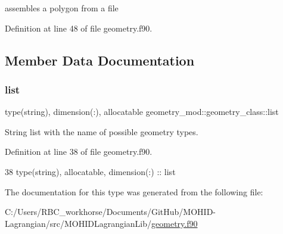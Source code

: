 assembles a polygon from a file 



Definition at line 48 of file geometry.\+f90.



\subsection{Member Data Documentation}
\mbox{\label{structgeometry__mod_1_1geometry__class_a218ff308d9bb94f4386573d7329babc6}} 
\subsubsection{\texorpdfstring{list}{list}}
{\footnotesize\ttfamily type(string), dimension(\+:), allocatable geometry\+\_\+mod\+::geometry\+\_\+class\+::list\hspace{0.3cm}{\ttfamily [private]}}



String list with the name of possible geometry types. 



Definition at line 38 of file geometry.\+f90.


\begin{DoxyCode}
38         \textcolor{keywordtype}{type}(string), \textcolor{keywordtype}{allocatable}, \textcolor{keywordtype}{dimension(:)} :: list
\end{DoxyCode}


The documentation for this type was generated from the following file\+:\begin{DoxyCompactItemize}
\item 
C\+:/\+Users/\+R\+B\+C\+\_\+workhorse/\+Documents/\+Git\+Hub/\+M\+O\+H\+I\+D-\/\+Lagrangian/src/\+M\+O\+H\+I\+D\+Lagrangian\+Lib/\mbox{\hyperlink{geometry_8f90}{geometry.\+f90}}\end{DoxyCompactItemize}
